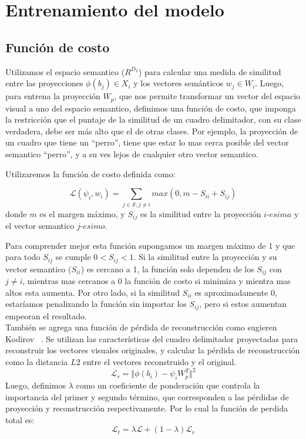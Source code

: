 \section{Entrenamiento del modelo}\label{ssec:entrenamiento}

\subsection{Función de costo}

Utilizamos el espacio semantico (${R}^{D_2}$) para calcular una medida de similitud entre las proyecciones $\phi(b_j) \in X_i	$ y los vectores semánticos $w_j \in W_i$. Luego, para entrena la proyección $W_p$, que nos permite transformar un vector del espacio visual a uno del espacio semantico, definimos una función de costo, que imponga la restricción que el puntaje de la similitud de un cuadro delimitador, con su clase verdadera, debe ser más alto que el de otras clases. Por ejemplo, la proyección de un cuadro que tiene un ``perro'', tiene que estar lo mas cerca posible del vector semantico ``perro'', y a su ves lejos de cualquier otro vector semantico.

Utilizaremos la función de costo definida como: 

\[\mathcal{L}(\psi_i, w_i) = \sum_{j \in \mathcal{S}, j\neq i} max(0, m - S_{ii} + S_{ij})\] 
donde $m$ es el margen máximo, y $S_{ij}$ es la similitud entre la proyección $i$-$esima$ y el vector semantico $j$-$esimo$. 

Para comprender mejor esta función supongamos un margen máximo de 1 y que para todo $S_{ij}$ se cumple $0 < S_{ij} < 1$. Si la similitud entre la proyección y su vector semantico ($S_{ii}$) es cercano a 1, la función solo dependen de los $S_{ij}$ con $j \neq i$, mientras mas cercanos a 0 la función de costo si minimiza y mientra mas altos esta aumenta. Por otro lado, si la similitud $S_{ii}$ es aproximadamente 0, estaríamos penalizando la función sin importar los $S_{ij}$, pero si estos aumentan empeoran el resultado. \\


También se agrega una función de pérdida de reconstrucción como sugieren Kodirov \etal~\cite{kodirov2017semantic}. Se utilizan las características del cuadro delimitador proyectadas para reconstruir los vectores visuales originales, y calcular la pérdida de reconstrucción como la distancia $L2$  entre el vectores reconstruido y el original.
\[\mathcal{L}_r = \Vert{\phi(b_i) - \psi_iW_p^T}\Vert^2 \] 
Luego, definimos $\lambda$ como un coeficiente de ponderación que controla la importancia del primer y segundo término, que corresponden a las pérdidas de proyección y reconstrucción respectivamente. Por lo cual la función de perdida total es: 
\[\mathcal{L}_t = \lambda \mathcal{L} + (1-\lambda) \mathcal{L}_r \]
 

